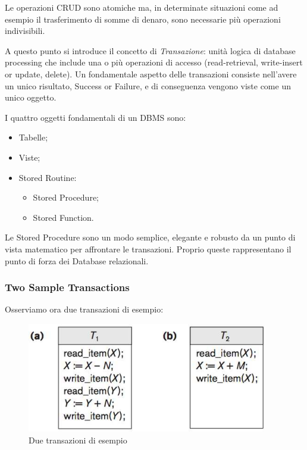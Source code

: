 Le operazioni CRUD sono atomiche ma, in determinate situazioni come ad esempio il trasferimento di somme di denaro, sono necessarie più operazioni indivisibili. 

A questo punto si introduce il concetto di \textit{Transazione}: unità logica di database processing che include una o più operazioni di accesso (read-retrieval, write-insert or update, delete).  Un fondamentale aspetto delle transazioni consiste nell’avere un unico risultato, Success or Failure, e di conseguenza vengono viste come un unico oggetto.  

I quattro oggetti fondamentali di un DBMS sono:

\begin{itemize}

\item Tabelle;
\item Viste;
\item Stored Routine:

\begin{itemize}

\item Stored Procedure;
\item Stored Function.

\end{itemize}

\end{itemize}
  
Le Stored Procedure sono un modo semplice, elegante e robusto da un punto di vista matematico per affrontare le transazioni. Proprio queste rappresentano il punto di forza dei Database relazionali. 


\subsubsection{Two Sample Transactions}

Osserviamo ora due transazioni di esempio:

\begin{center}
\begin{figure}[H]
\centering
\includegraphics[scale=1]{figures/two_trans.png}
\caption{Due transazioni di esempio}
\end{figure}
\end{center}

